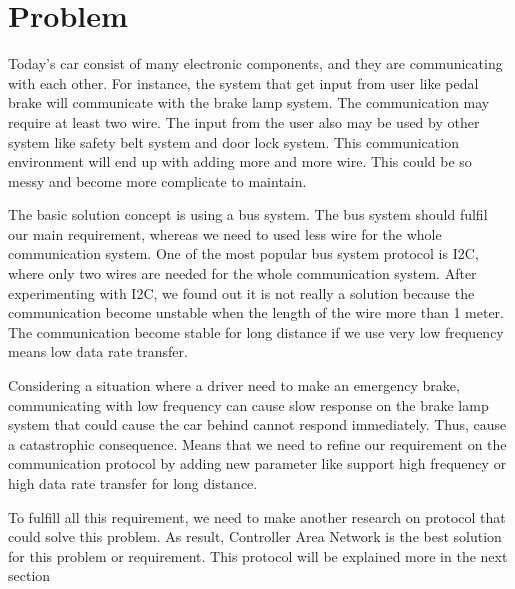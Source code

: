 
\section{Problem}

Today's car consist of many electronic components, and they are communicating with each other.  For instance, the system that get input from user like pedal brake will communicate with the brake lamp system. The communication may require at least two wire. The input from the user also may be used by other system like safety belt system and door lock system. This  communication environment will end up with adding more and more wire. This could be so messy and become more complicate to maintain.

The basic solution concept is using a bus system. The bus system should fulfil our main requirement, whereas we need to used less wire for the whole communication system. One of the most popular bus system protocol is I2C, where only two wires are needed for the whole communication system. After experimenting with I2C, we found out it is not really a solution because the communication become unstable when the length of the wire more than 1 meter. The communication become stable for long distance if we use very low frequency means low data rate transfer. 

Considering a situation where a driver need to make an emergency brake, communicating with low frequency can cause slow response on the brake lamp system that could cause the car behind cannot respond immediately. Thus, cause a catastrophic consequence. Means that we need to refine our requirement on the communication protocol by adding new parameter like support high frequency or high data rate transfer for long distance. 

To fulfill all this requirement, we need to make another research on protocol that could solve this problem. As result, Controller Area Network is the best solution for this problem or requirement. This protocol will be explained more in the next section


